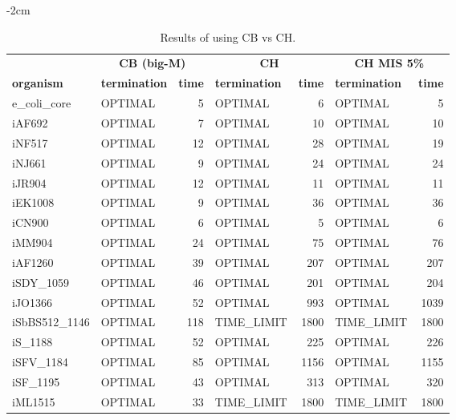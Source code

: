 \begin{table}[!ht]
    \small
    \centering
    \addtolength{\leftskip} {-2cm}
    \addtolength{\rightskip}{-2cm}
    \begin{tabular}{@{\extracolsep{4pt}}llrlrlr@{}}
    \hline
        \multicolumn{1}{c}{} & \multicolumn{2}{c}{\textbf{CB (big-M)}} & \multicolumn{2}{c}{\textbf{CH}} & \multicolumn{2}{c}{\textbf{CH MIS 5\%}} \\ \cline{2-3} \cline{4-5} \cline{6-7} 
        \textbf{organism} & \textbf{termination} & \textbf{time} & \textbf{termination} & \textbf{time} & \textbf{termination} & \textbf{time} \\ \hline
        e\_coli\_core & OPTIMAL & 5 & OPTIMAL & 6 & OPTIMAL & 5 \\ 
        iAF692 & OPTIMAL & 7 & OPTIMAL & 10 &OPTIMAL & 10 \\ 
        iNF517 & OPTIMAL & 12 & OPTIMAL & 28 & OPTIMAL & 19 \\ 
        iNJ661 & OPTIMAL & 9 & OPTIMAL & 24 & OPTIMAL & 24 \\ 
        iJR904 & OPTIMAL & 12 & OPTIMAL & 11 & OPTIMAL & 11 \\ 
        iEK1008 & OPTIMAL & 9 & OPTIMAL & 36 & OPTIMAL & 36 \\ 
        iCN900 & OPTIMAL & 6 & OPTIMAL & 5 & OPTIMAL & 6 \\ 
        iMM904 & OPTIMAL & 24 & OPTIMAL & 75 & OPTIMAL & 76 \\ 
        iAF1260 & OPTIMAL & 39 & OPTIMAL & 207 & OPTIMAL & 207 \\ 
        iSDY\_1059 & OPTIMAL & 46 & OPTIMAL & 201 & OPTIMAL & 204 \\ 
        iJO1366 & OPTIMAL & 52 & OPTIMAL & 993 & OPTIMAL & 1039 \\ 
        iSbBS512\_1146 & OPTIMAL & 118 & TIME\_LIMIT & 1800 & TIME\_LIMIT & 1800 \\ 
        iS\_1188 & OPTIMAL & 52 & OPTIMAL & 225 & OPTIMAL & 226 \\ 
        iSFV\_1184 & OPTIMAL & 85 & OPTIMAL & 1156 & OPTIMAL & 1155 \\ 
        iSF\_1195 & OPTIMAL & 43 & OPTIMAL & 313 & OPTIMAL & 320 \\ 
        iML1515 & OPTIMAL & 33 & TIME\_LIMIT & 1800 & TIME\_LIMIT & 1800 \\ \hline
    \end{tabular}
    \caption{\label{Tab:ch_vs_cb} Results of using CB vs CH.}
\end{table}

